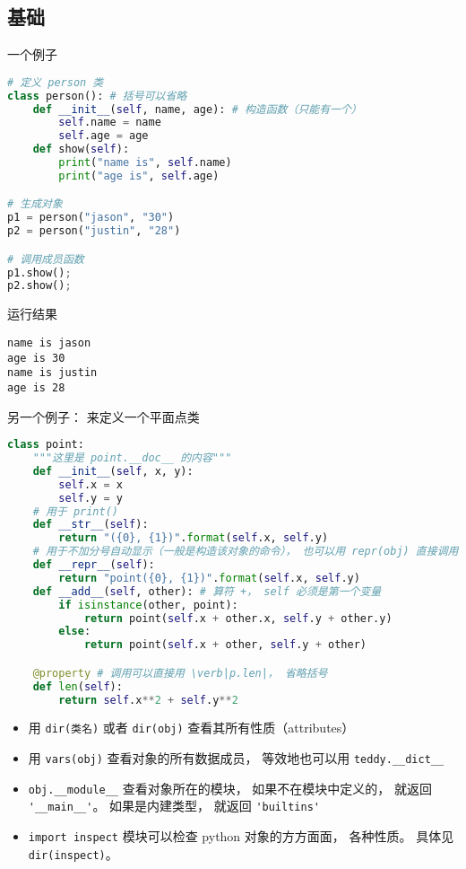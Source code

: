 
\begin{issues}
\issueDraft
\end{issues}


\subsection{基础}
一个例子
\begin{lstlisting}[language=python]
# 定义 person 类
class person(): # 括号可以省略
    def __init__(self, name, age): # 构造函数（只能有一个）
        self.name = name 
        self.age = age 
    def show(self): 
        print("name is", self.name)
        print("age is", self.age)

# 生成对象
p1 = person("jason", "30") 
p2 = person("justin", "28")

# 调用成员函数
p1.show();
p2.show();
\end{lstlisting}
运行结果
\begin{lstlisting}[language=none]
name is jason
age is 30
name is justin
age is 28
\end{lstlisting}

另一个例子： 来定义一个平面点类
\begin{lstlisting}[language=python]
class point:
    """这里是 point.__doc__ 的内容"""
    def __init__(self, x, y): 
        self.x = x
        self.y = y
    # 用于 print()
    def __str__(self):
        return "({0}, {1})".format(self.x, self.y)
    # 用于不加分号自动显示（一般是构造该对象的命令）， 也可以用 repr(obj) 直接调用
    def __repr__(self):
        return "point({0}, {1})".format(self.x, self.y)
    def __add__(self, other): # 算符 +， self 必须是第一个变量
        if isinstance(other, point):
            return point(self.x + other.x, self.y + other.y)
        else:
            return point(self.x + other, self.y + other)

    @property # 调用可以直接用 \verb|p.len|， 省略括号
    def len(self):
        return self.x**2 + self.y**2
\end{lstlisting}

\begin{itemize}
\item 用 \verb|dir(类名)| 或者 \verb|dir(obj)| 查看其所有性质（attributes）
\item 用 \verb|vars(obj)| 查看对象的所有数据成员， 等效地也可以用 \verb|teddy.__dict__|
\item \verb|obj.__module__| 查看对象所在的模块， 如果不在模块中定义的， 就返回 \verb|'__main__'|。 如果是内建类型， 就返回 \verb|'builtins'|
\item \verb|import inspect| 模块可以检查 python 对象的方方面面， 各种性质。 具体见 \verb|dir(inspect)|。
\end{itemize}

